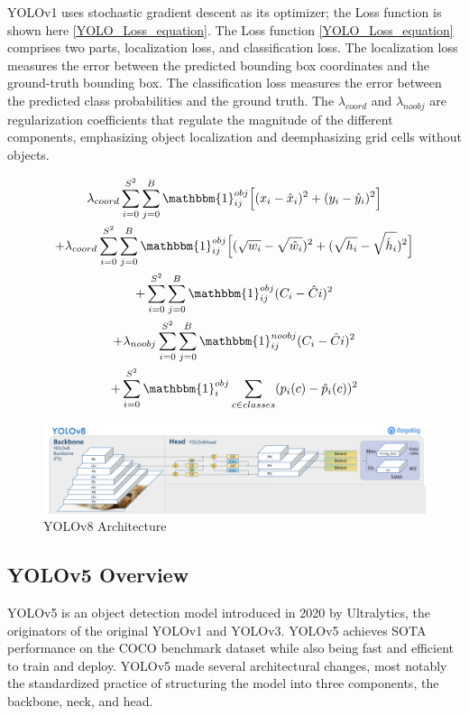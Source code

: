 \documentclass[10pt,twocolumn,letterpaper]{article}
\begin{document}
YOLOv1 uses stochastic gradient descent as its optimizer; the Loss function is shown here \ref{YOLO_Loss_equation}. The Loss function \ref{YOLO_Loss_equation} comprises two parts, localization loss, and classification loss. The localization loss measures the error between the predicted bounding box coordinates and the ground-truth bounding box. The classification loss measures the error between the predicted class probabilities and the ground truth. The $\lambda_{coord}$ and $\lambda_{noobj}$ are regularization coefficients that regulate the magnitude of the different components, emphasizing object localization and deemphasizing grid cells without objects. 

\begin{multline} \label{YOLO_Loss_equation}
\lambda_{coord}\sum_{i=0}^{S^2}\sum_{j=0}^{B}\mathbbm{1}_{ij}^{obj}\Big[(x_i-\hat{x}_i)^2+(y_i-\hat{y}_i)^2\Big] \\ + \lambda_{coord}\sum_{i=0}^{S^2}\sum_{j=0}^{B}\mathbbm{1}_{ij}^{obj}\Big[(\sqrt{w_i}-\sqrt{\hat{w}_i})^2+(\sqrt{h_i}-\sqrt{\hat{h}_i})^2\Big]\\
+\sum_{i=0}^{S^2}\sum_{j=0}^{B}\mathbbm{1}_{ij}^{obj}(C_i-\hat{C}i)^2\\
+\lambda_{noobj}\sum_{i=0}^{S^2}\sum_{j=0}^{B}\mathbbm{1}_{ij}^{noobj}(C_i-\hat{C}i)^2\\
+\sum_{i=0}^{S^2}\mathbbm{1}_{i}^{obj}\sum_{c\in classes}(p_i(c)-\hat{p}_i(c))^2
\end{multline}

\begin{figure}[h]
    \centering
    \includegraphics[width=1.0\textwidth]{figures/YOLOv8_arch.png}
    \caption{YOLOv8 Architecture ~\cite{YOLOv8Website}}
    \label{fig:YOLOv8_arch}
\end{figure}


\subsection{YOLOv5 Overview}

YOLOv5 \cite{Drone-Detection-Using-YOLOv5} is an object detection model introduced in 2020 by Ultralytics, the originators of the original YOLOv1 and YOLOv3. YOLOv5 achieves SOTA performance on the COCO benchmark dataset \cite{YOLOv5Doc} while also being fast and efficient to train and deploy. YOLOv5 made several architectural changes, most notably the standardized practice of structuring the model into three components, the backbone, neck, and head.
\end{document}
